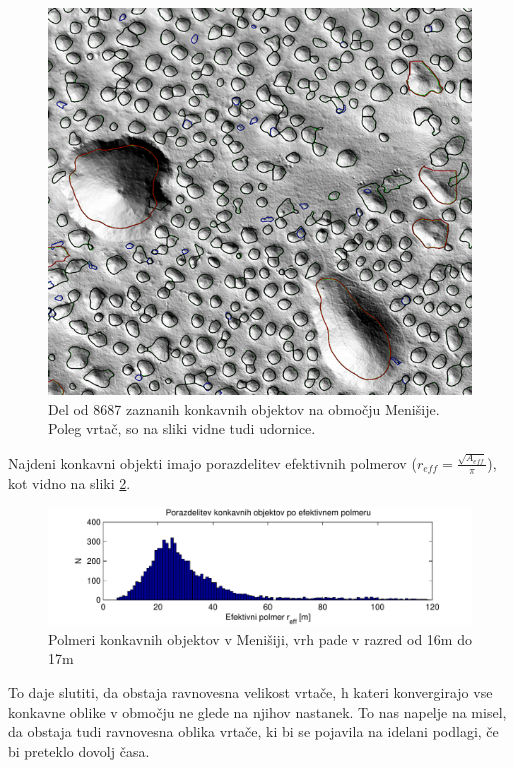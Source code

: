 \documentclass[a4paper, oneside, 12pt]{book}
\begin{document}
\begin{figure}[H]
  \begin{center}
    \includegraphics[width=13cm]{slike/menisija-vrtace}
  \end{center}
  \caption{Del od 8687 zaznanih konkavnih objektov na območju Menišije. Poleg vrtač, so na sliki vidne tudi udornice.}
  \label{fig:menisija-vrtace}
\end{figure}


Najdeni konkavni objekti imajo porazdelitev efektivnih polmerov (\mbox{$r_{eff}=\frac{\sqrt{A_{eff}}}{\pi}$}), kot vidno na sliki \ref{fig:menisija-polmeri-hist}.

\begin{figure}[H]
  \centering
  \includegraphics{slike/menisija-polmeri-hist}
  \caption{Polmeri konkavnih objektov v Menišiji, vrh pade v razred od 16m do 17m}
  \label{fig:menisija-polmeri-hist}
\end{figure}

To daje slutiti, da obstaja ravnovesna velikost vrtače, h kateri konvergirajo vse konkavne oblike v območju ne glede na njihov nastanek.
To nas napelje na misel, da obstaja tudi ravnovesna oblika vrtače, ki bi se pojavila na idelani podlagi, če bi preteklo dovolj časa.
\end{document}
